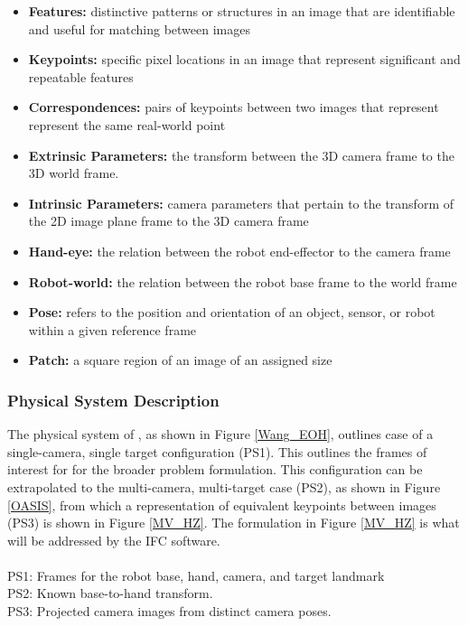 \documentclass[12pt]{article}
\begin{document}
\begin{itemize}

\item \textbf{Features:} distinctive patterns or structures in an image that are 
identifiable and useful for matching between images

\item \textbf{Keypoints:} specific pixel locations in an image that represent 
significant and repeatable features

\item \textbf{Correspondences:} pairs of keypoints between two images that represent 
represent the same real-world point

\item \textbf{Extrinsic Parameters:} the transform between the 3D camera frame to the 
3D world frame.

\item \textbf{Intrinsic Parameters:} camera parameters that pertain to the transform of the 
2D image plane frame to the 3D camera frame

\item \textbf{Hand-eye:} the relation between the robot end-effector to the camera frame

\item \textbf{Robot-world:} the relation between the robot base frame to the world frame

\item \textbf{Pose:} refers to the position and orientation of an object, sensor, or robot 
within a given reference frame 

\item \textbf{Patch:} a square region of an image of an assigned size
\end{itemize}

\subsubsection{Physical System Description} \label{sec_phySystDescrip}
The physical system of \progname{}, as shown in Figure \ref{Wang_EOH}, outlines 
case of a single-camera, single target configuration (PS1). This outlines the frames of 
interest for for the broader problem formulation. This configuration can be extrapolated to the multi-camera, 
multi-target case (PS2), as shown in Figure \ref{OASIS}, from which a representation of equivalent keypoints 
between images (PS3) is shown in Figure \ref{MV_HZ}. The formulation in Figure \ref{MV_HZ} is what will be addressed 
by the IFC software.
\\
\\
\noindent\label{PS_1}PS1: Frames for the robot base, hand, camera, and target landmark\\
\noindent\label{PS_2}PS2: Known base-to-hand transform.\\
\noindent\label{PS_3}PS3: Projected camera images from distinct camera poses.
\end{document}
